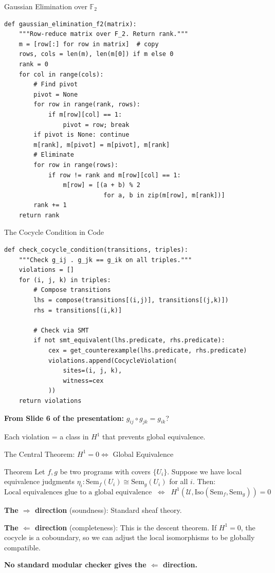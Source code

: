 \documentclass[aspectratio=169,10pt]{beamer}
\newcommand{\Uscr}{\mathcal{U}}
\newcommand{\Iso}{\mathrm{Iso}}
\newcommand{\Sem}{\mathrm{Sem}}
\begin{document}
\begin{frame}[fragile]{Gaussian Elimination over $\mathbb{F}_2$}
\begin{lstlisting}
def gaussian_elimination_f2(matrix):
    """Row-reduce matrix over F_2. Return rank."""
    m = [row[:] for row in matrix]  # copy
    rows, cols = len(m), len(m[0]) if m else 0
    rank = 0
    for col in range(cols):
        # Find pivot
        pivot = None
        for row in range(rank, rows):
            if m[row][col] == 1:
                pivot = row; break
        if pivot is None: continue
        m[rank], m[pivot] = m[pivot], m[rank]
        # Eliminate
        for row in range(rows):
            if row != rank and m[row][col] == 1:
                m[row] = [(a + b) % 2 
                           for a, b in zip(m[row], m[rank])]
        rank += 1
    return rank
\end{lstlisting}
\end{frame}

\begin{frame}[fragile]{The Cocycle Condition in Code}
\begin{lstlisting}
def check_cocycle_condition(transitions, triples):
    """Check g_ij . g_jk == g_ik on all triples."""
    violations = []
    for (i, j, k) in triples:
        # Compose transitions
        lhs = compose(transitions[(i,j)], transitions[(j,k)])
        rhs = transitions[(i,k)]
        
        # Check via SMT
        if not smt_equivalent(lhs.predicate, rhs.predicate):
            cex = get_counterexample(lhs.predicate, rhs.predicate)
            violations.append(CocycleViolation(
                sites=(i, j, k), 
                witness=cex
            ))
    return violations
\end{lstlisting}

\textbf{From Slide 6 of the presentation:} $g_{ij} \circ g_{jk} = g_{ik}$?

Each violation = a class in $H^1$ that prevents global equivalence.
\end{frame}

\begin{frame}{The Central Theorem: $H^1 = 0 \Leftrightarrow$ Global Equivalence}
\begin{block}{Theorem}
Let $f, g$ be two programs with covers $\{U_i\}$. Suppose we have local equivalence judgments $\eta_i : \Sem_f(U_i) \cong \Sem_g(U_i)$ for all $i$. Then:
\[
\text{Local equivalences glue to a global equivalence} \;\;\Leftrightarrow\;\; H^1(\Uscr, \Iso(\Sem_f, \Sem_g)) = 0
\]
\end{block}

\textbf{The $\Rightarrow$ direction} (soundness): Standard sheaf theory.

\textbf{The $\Leftarrow$ direction} (completeness): This is the descent theorem. If $H^1 = 0$, the cocycle is a coboundary, so we can adjust the local isomorphisms to be globally compatible.

\textbf{No standard modular checker gives the $\Leftarrow$ direction.}
\end{frame}
\end{document}
